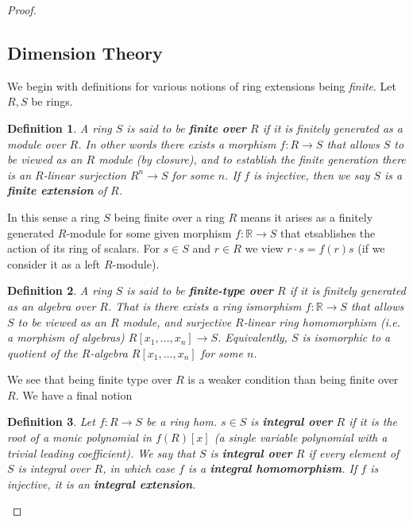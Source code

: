 \documentclass{report}
\providecommand{\R}{\mathbb{R}}
\newtheorem{defi}{Definition}
\begin{document}
\begin{proof}
\begin{enumerate}
  \subsection{Dimension Theory}
  We begin with definitions for various notions of ring extensions being \textit{finite}. Let $R,S$ be rings.
  \begin{defi}
    A ring $S$ is said to be \textbf{finite over} $R$ if it is finitely generated as a module over $R$. In other words there exists a morphism $f:R\to S$ that allows $S$ to be viewed as an $R$ module (by closure), and to establish the finite generation there is an $R$-linear surjection $R^n\to S$ for some $n$. If $f$ is injective, then we say $S$ is a \textbf{finite extension} of $R$.
  \end{defi}
  In this sense a ring $S$ being finite over a ring $R$ means it arises as a finitely generated $R$-module for some given morphism $f:\R\to S$ that etsablishes the action of its ring of scalars. For $s\in S$ and $r\in R$ we view $r\cdot s=f(r)s$ (if we consider it as a left $R$-module).
  \begin{defi}
    A ring $S$ is said to be \textbf{finite-type over} $R$ if it is finitely generated as an algebra over $R$. That is there exists a ring ismorphism $f:\R\to S$ that allows $S$ to be viewed as an $R$ module, and surjective $R$-linear ring homomorphism (i.e. a morphism of algebras) $R[x_1,\ldots,x_n]\to S$. Equivalently, $S$ is isomorphic to a quotient of the $R$-algebra $R[x_1,\ldots,x_n]$ for some $n$.
  \end{defi}
  We see that being finite type over $R$ is a weaker condition than being finite over $R$. We have a final notion
  \begin{defi}
    Let $f:R\to S$ be a ring hom. $s\in S$ is \textbf{integral over} $R$ if it is the root of a monic polynomial in $f(R)[x]$ (a single variable polynomial with a trivial leading coefficient). We say that $S$ is \textbf{integral over} $R$ if every element of $S$ is integral over $R$, in which case $f$ is a \textbf{integral homomorphism}. If $f$ is injective, it is an \textbf{integral extension}.
  \end{defi}


\end{enumerate}
\end{proof}
\end{document}
